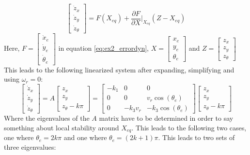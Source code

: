\begin{equation}
    \begin{bmatrix}
    \dot{z}_x \\ 
    \dot{z}_y \\ 
    \dot{z}_{\theta}
    \end{bmatrix}
    =
    F(X_{eq}) + \frac{\partial F}{\partial X} |_{X_{eq}} (Z - X_{eq})
    \label{eq:ex5_linear}
\end{equation}
Here, $F = \begin{bmatrix}
\dot{x}_e \\ \dot{y}_e \\ \dot{\theta}_e
\end{bmatrix}$ in equation \eqref{eq:ex2_errordyn}, $X = \begin{bmatrix}
x_e \\ y_e \\ \theta_e
\end{bmatrix}$ and $Z = \begin{bmatrix}
z_x \\ z_y \\ z_{\theta}
\end{bmatrix}$
This leads to the following linearized system after expanding, simplifying and using $\omega_r = 0$:
\begin{equation}
    \begin{bmatrix}
    \dot{z}_x \\ 
    \dot{z}_y \\ 
    \dot{z}_{\theta}
    \end{bmatrix}
    =
    A \begin{bmatrix}
    z_x \\ z_y \\ z_{\theta} -k \pi
    \end{bmatrix}
    =
    \begin{bmatrix}
    -k_1 & 0 & 0 \\
    0 & 0 & v_r \cos(\theta_e) \\
    0 & -k_3 v_r & -k_3 \cos(\theta_e)
    \end{bmatrix}
    \begin{bmatrix}
    z_x \\ z_y \\ z_{\theta} -k \pi
    \end{bmatrix}
    \label{eq:ex5_linear2}
\end{equation}
Where the eigenvalues of the $A$ matrix have to be determined in order to say something about local stability around $X_{eq}$. This leads to the following two cases, one where $\theta_e = 2 k \pi$ and one where $\theta_e = (2k + 1) \pi$. This leads to two sets of three eigenvalues: \\
